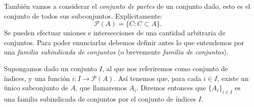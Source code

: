También vamos a considerar el \emph{conjunto de partes} de un conjunto
dado, esto es el conjunto de todos sus subconjuntos.
Explícitamente:
\[\mathscr{P}(A)=\{C:C\subset A\}.\]
Se pueden efectuar uniones e intersecciones de una cantidad
arbitraria de conjuntos. Para poder enunciarlas debemos definir
antes lo que entendemos por una \emph{familia subindicada de
conjuntos} (o brevemente \emph{familia de conjuntos}).

\begin{definicion}{}  Supongamos dado un conjunto $I$, al que nos referiremos como
conjunto de índices, y una función $i:I\longrightarrow
\mathscr{P}(A)$. Así tenemos que, para cada $i\in I$, existe
un único subconjunto de $A$, que llamaremos $A_i$. Diremos entonces que $\{A_i\}_{i\in I}$ es una familia
subindicada de conjuntos por el conjunto de índices $I$.
\end{definicion}


